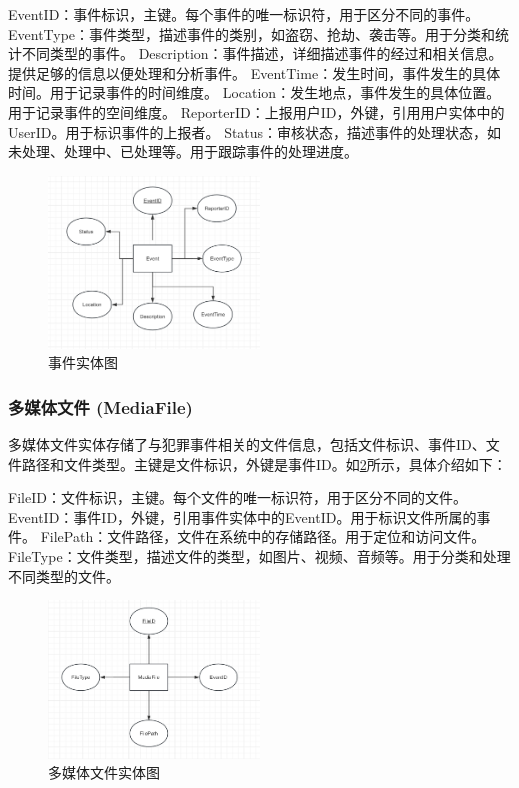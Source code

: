 EventID：事件标识，主键。每个事件的唯一标识符，用于区分不同的事件。
EventType：事件类型，描述事件的类别，如盗窃、抢劫、袭击等。用于分类和统计不同类型的事件。
Description：事件描述，详细描述事件的经过和相关信息。提供足够的信息以便处理和分析事件。
EventTime：发生时间，事件发生的具体时间。用于记录事件的时间维度。
Location：发生地点，事件发生的具体位置。用于记录事件的空间维度。
ReporterID：上报用户ID，外键，引用用户实体中的UserID。用于标识事件的上报者。
Status：审核状态，描述事件的处理状态，如未处理、处理中、已处理等。用于跟踪事件的处理进度。

\begin{figure}[htbp]
    \centering
    \includegraphics[width=0.5\textwidth]{figures/db-img-02.png}
    \caption{事件实体图}
    \label{fig:entity-event}
\end{figure}

\subsubsection{多媒体文件 (MediaFile)}

多媒体文件实体存储了与犯罪事件相关的文件信息，包括文件标识、事件ID、文件路径和文件类型。主键是文件标识，外键是事件ID。如\cref{fig:entity-mediafile}所示，具体介绍如下：

FileID：文件标识，主键。每个文件的唯一标识符，用于区分不同的文件。
EventID：事件ID，外键，引用事件实体中的EventID。用于标识文件所属的事件。
FilePath：文件路径，文件在系统中的存储路径。用于定位和访问文件。
FileType：文件类型，描述文件的类型，如图片、视频、音频等。用于分类和处理不同类型的文件。

\begin{figure}[htbp]
    \centering
    \includegraphics[width=0.5\textwidth]{figures/db-img-03.png}
    \caption{多媒体文件实体图}
    \label{fig:entity-mediafile}
\end{figure}

